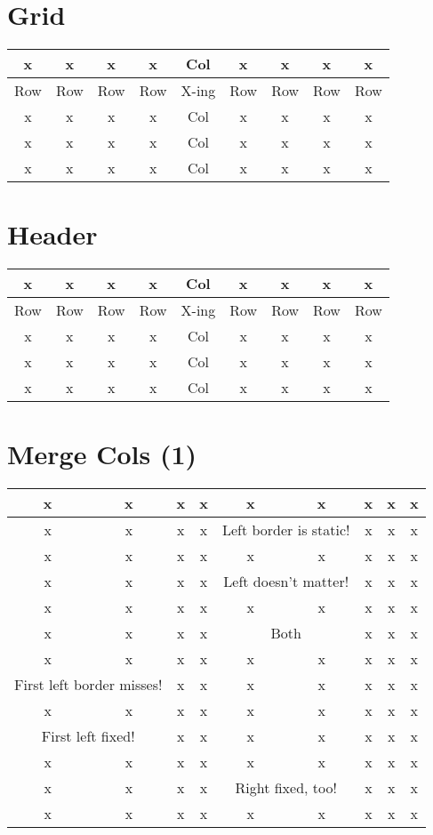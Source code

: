 \documentclass[a4paper,10pt]{scrartcl}
\begin{document}
\section{Grid}
\begin{tabular}{|c|c|c|c|c|c|c|c|c|} \hline
x & x & x & x & Col & x & x & x & x \\ \hline 
Row & Row & Row & Row & X-ing & Row & Row & Row & Row \\ \hline 
x & x & x & x & Col & x & x & x & x \\ \hline
x & x & x & x & Col & x & x & x & x \\ \hline
x & x & x & x & Col & x & x & x & x \\ \hline
\end{tabular}
\newline


\section{Header}
\begin{tabular}{|c||cccccccc|} \hline
x & x & x & x & Col & x & x & x & x \\ \hline \hline
Row & Row & Row & Row & X-ing & Row & Row & Row & Row \\
x & x & x & x & Col & x & x & x & x \\
x & x & x & x & Col & x & x & x & x \\
x & x & x & x & Col & x & x & x & x \\ \hline
\end{tabular}
\newline


\section{Merge Cols (1)}
\begin{tabular}{|c|c|c|c|c|c|c|c|c|} \hline
x & x & x & x & x & x & x & x & x \\ \hline
x & x & x & x & \multicolumn{2}{c}{Left border is static!} & x & x & x \\ \hline
x & x & x & x & x & x & x & x & x \\ \hline
x & x & x & x & \multicolumn{2}{|c}{Left doesn't matter!} & x & x & x \\ \hline
x & x & x & x & x & x & x & x & x \\ \hline
x & x & x & x & \multicolumn{2}{|c|}{Both} & x & x & x \\ \hline
x & x & x & x & x & x & x & x & x \\ \hline
\multicolumn{2}{c}{First left border misses!} & x & x & x & x & x & x & x \\ \hline
x & x & x & x & x & x & x & x & x \\ \hline
\multicolumn{2}{|c}{First left fixed!} & x & x & x & x & x & x & x \\ \hline
x & x & x & x & x & x & x & x & x \\ \hline
x & x & x & x & \multicolumn{2}{c|}{Right fixed, too!} & x & x & x \\ \hline
x & x & x & x & x & x & x & x & x \\ \hline
\end{tabular}
\newline
\end{document}
